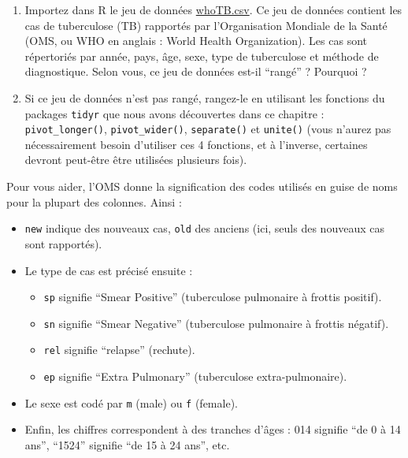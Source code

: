 \documentclass[
  a4paper,
]{article}
\providecommand{\tightlist}{%
  \setlength{\itemsep}{0pt}\setlength{\parskip}{0pt}}
\begin{document}
\begin{enumerate}
\def\labelenumi{\arabic{enumi}.}
\setcounter{enumi}{2}
\tightlist
\item
  Importez dans R le jeu de données \href{data/whoTB.csv}{whoTB.csv}. Ce jeu de données contient les cas de tuberculose (TB) rapportés par l'Organisation Mondiale de la Santé (OMS, ou WHO en anglais : World Health Organization). Les cas sont répertoriés par année, pays, âge, sexe, type de tuberculose et méthode de diagnostique. Selon vous, ce jeu de données est-il ``rangé'' ? Pourquoi ?
\item
  Si ce jeu de données n'est pas rangé, rangez-le en utilisant les fonctions du packages \texttt{tidyr} que nous avons découvertes dans ce chapitre : \texttt{pivot\_longer()}, \texttt{pivot\_wider()}, \texttt{separate()} et \texttt{unite()} (vous n'aurez pas nécessairement besoin d'utiliser ces 4 fonctions, et à l'inverse, certaines devront peut-être être utilisées plusieurs fois).
\end{enumerate}

Pour vous aider, l'OMS donne la signification des codes utilisés en guise de noms pour la plupart des colonnes. Ainsi :

\begin{itemize}
\tightlist
\item
  \texttt{new} indique des nouveaux cas, \texttt{old} des anciens (ici, seuls des nouveaux cas sont rapportés).
\item
  Le type de cas est précisé ensuite :

  \begin{itemize}
  \tightlist
  \item
    \texttt{sp} signifie ``Smear Positive'' (tuberculose pulmonaire à frottis positif).
  \item
    \texttt{sn} signifie ``Smear Negative'' (tuberculose pulmonaire à frottis négatif).
  \item
    \texttt{rel} signifie ``relapse'' (rechute).
  \item
    \texttt{ep} signifie ``Extra Pulmonary'' (tuberculose extra-pulmonaire).
  \end{itemize}
\item
  Le sexe est codé par \texttt{m} (male) ou \texttt{f} (female).
\item
  Enfin, les chiffres correspondent à des tranches d'âges : 014 signifie ``de 0 à 14 ans'', ``1524'' signifie ``de 15 à 24 ans'', etc.
\end{itemize}
\end{document}
